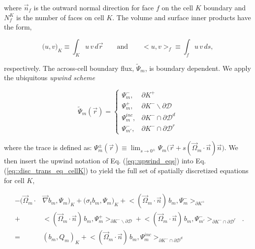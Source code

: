 \documentclass[11pt]{article}
\begin{document}
\noindent where $\vec{n}_f$ is the outward normal direction for face $f$ on the cell $K$ boundary and $N_f^K$ is the number of faces on cell $K$. The volume and surface inner products have the form,

\begin{equation}
\label{eq::inner_prod}
\Big( u,v \Big)_K \equiv \int_K u \, v \, d \vec{r} \qquad \text{and} \qquad \Big< u,v \Big>_f \equiv \int_f u \, v \, d s ,
\end{equation}

\noindent respectively. The across-cell boundary flux, $\tilde{\Psi}_m$, is boundary dependent. We apply the ubiquitous {\em upwind scheme} 

\begin{equation}
\label{eq::upwind_eqs}
\tilde{\Psi}_m (\vec{r})  = 
\begin{cases}
\Psi_m^{-} , & \partial K^+ \\
\Psi_m^{+}, & \partial K^- \backslash \partial \mathcal{D} \\
\Psi_m^{inc}, & \partial K^- \cap \partial \mathcal{D}^d \\
\Psi_{m'}^{-}, & \partial K^- \cap \partial \mathcal{D}^r
\end{cases}
\end{equation}

\noindent where the trace is defined as: $\Psi_m^{\pm} (\vec{r}) \equiv \lim_{s \rightarrow 0^{\pm}} \Psi_m \Big( \vec{r} + s (\vec{\Omega}_m \cdot \vec{n}) \vec{n} \Big)$. We then insert the upwind notation of Eq. (\ref{eq::upwind_eqs}) into Eq. (\ref{eq::disc_trans_eq_cellK}) to yield the full set of spatially discretized equations for cell $K$,

\begin{equation}
\label{eq::full_cellK_disc}
\begin{aligned}
-  \Big( \vec{\Omega}_m \cdot  & \vec{\nabla} b_m, \Psi_{m} \Big)_{K}   + \Big(  \sigma_{t} b_m ,   \Psi_{m} \Big)_{K} +  \Big< ( \vec{\Omega}_m \cdot \vec{n} ) \, b_m, {\Psi}_m^{-}  \Big>_{\partial K^+}  \\
  + & \Big< ( \vec{\Omega}_m \cdot \vec{n} ) \, b_m, {\Psi}_m^{+}  \Big>_{\partial K^- \backslash \partial \mathcal{D}}  + \Big< ( \vec{\Omega}_m \cdot \vec{n} ) \, b_m, {\Psi}^{-}_{m'}  \Big>_{\partial K^- \cap \partial \mathcal{D}^r}  \\
= & \left(  b_m ,   Q_m \right)_{K} + \Big< ( \vec{\Omega}_m \cdot \vec{n} ) \, b_m, {\Psi}_m^{inc}  \Big>_{\partial K^- \cap \partial \mathcal{D}^d} 
\end{aligned} \, .
\end{equation}
\end{document}
